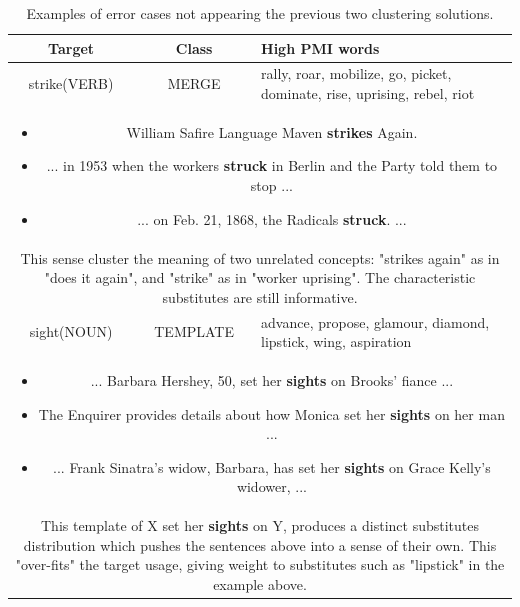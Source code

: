 \documentclass[11pt,a4paper]{article}
\begin{document}
\begin{table}[ht!]
\centering
\begin{tabularx}{\linewidth}{| c | c | X  |}
	\hline

	\textbf{Target} & \textbf{Class} & \textbf{High PMI words} \\ \hline \hline 
    strike(VERB) & MERGE & rally, roar, mobilize, go, picket, dominate, rise, uprising, rebel, riot \\ \hline
    \multicolumn{3}{|p{0.9\linewidth}|}{
    \begin{itemize}[topsep=0pt,itemsep=0pt,partopsep=0pt, parsep=0pt]
        \item William Safire Language Maven {\bf strikes} Again.
        \item ...  in 1953 when the workers {\bf struck} in Berlin and the Party told them to stop ...
        \item ...   on Feb. 21, 1868, the Radicals {\bf struck}. ...
    \end{itemize}
  } \\
  \multicolumn{3}{|p{0.9\linewidth}|}{
  This sense cluster the meaning of two unrelated concepts: "strikes again" as in "does it again", and "strike" as in "worker uprising". The characteristic substitutes are still informative.
  }\\
  \hline\hline
  sight(NOUN) & TEMPLATE &  advance, propose, glamour, diamond, lipstick, wing, aspiration \\ \hline
    \multicolumn{3}{|p{0.9\linewidth}|}{
    \begin{itemize}[topsep=0pt,itemsep=0pt,partopsep=0pt, parsep=0pt]
        \item ... Barbara Hershey, 50, set her {\bf sights} on Brooks' fiance ...
        \item The Enquirer provides details about how Monica set her {\bf sights} on her man ...
        \item ... Frank Sinatra's widow, Barbara, has set her {\bf sights} on Grace Kelly's widower, ...
    \end{itemize}
  }\\
  \multicolumn{3}{|p{0.9\linewidth}|}{
  This template of X set her {\bf sights} on Y, produces a distinct substitutes distribution which pushes the sentences above into a sense of their own. This "over-fits" the target usage, giving weight to substitutes such as "lipstick" in the example above.
  }\\
  \hline
\end{tabularx}
\caption{Examples of error cases not appearing the previous two clustering solutions.}
  \label{tab:qualrest}
\end{table}
\end{document}

